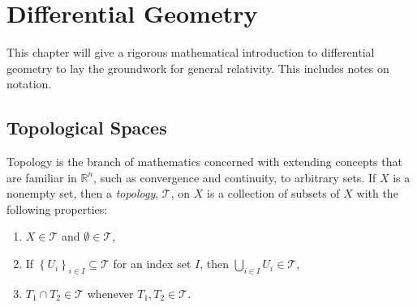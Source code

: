 %
%

\chapter{Differential Geometry}
This chapter will give a rigorous mathematical introduction to differential geometry to lay the groundwork for general relativity. This includes notes on notation.

\section{Topological Spaces}
Topology is the branch of mathematics concerned with extending concepts that are familiar in $\mathbb{R}^n$, such as convergence and continuity, to arbitrary sets. If $X$ is a nonempty set, then a \textit{topology}, $\mathscr{T}$, on $X$ is a collection of subsets of $X$ with the following properties:
\begin{enumerate}
	\item $X \in \mathscr{T}$ and $\emptyset \in \mathscr{T}$,
	\item If $\left\{U_i\right\}_{i \in I} \subseteq \mathscr{T}$ for an
index set $I$, then $\bigcup_{i \in I} U_i \in 		            
\mathscr{T}$,
	\item $T_1 \cap T_2 \in \mathscr{T}$ whenever $T_1, T_2 \in
\mathscr{T}$.
\end{enumerate}

